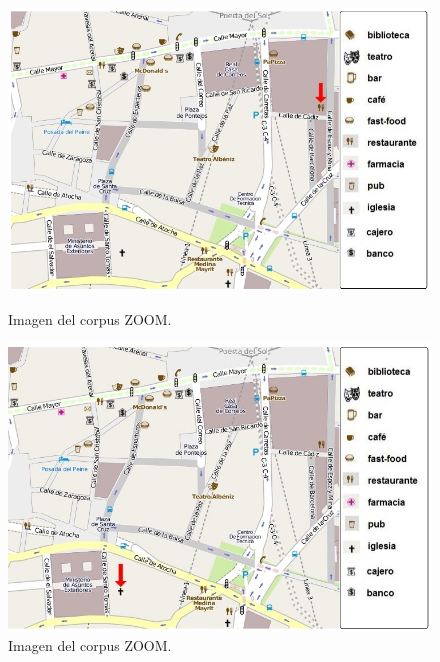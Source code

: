 \begin{figure}
\begin{minipage}[b]{0.5\linewidth}
\centering
\includegraphics[width=\textwidth]{images/corpus/mapa5.png}
\caption{Imagen del corpus ZOOM.}
\label{mapa5}
\end{minipage}
\hspace*{0cm}
\begin{minipage}[b]{0.5\linewidth}
\centering
\includegraphics[width=\textwidth]{images/corpus/mapa6.png}
\caption{Imagen del corpus ZOOM.}
\label{mapa6}
\end{minipage}
\end{figure}

